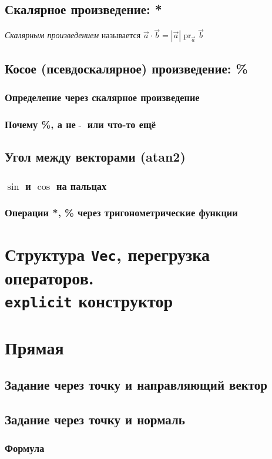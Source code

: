 \documentclass[a4paper,12pt]{article}
\def\v{\vec}
\DeclareMathOperator{\pr}{pr}
\begin{document}
    \subsection{Скалярное произведение: *}
      \emph{Скалярным произведением} называется
      $\v a \cdot \v b = |\v a|\pr_{\v a} \v b$
    \subsection{Косое (псевдоскалярное) произведение: \%}
      \subsubsection{Определение через скалярное произведение}
      \subsubsection{Почему \%, а не $\ \widehat{}\ $ или что-то ещё}
    \subsection{Угол между векторами (atan2)}
      \subsubsection{$\sin$ и $\cos$ на пальцах}
      \subsubsection{Операции *, \% через тригонометрические функции}
   \section{Структура \texttt{Vec}, перегрузка операторов.\\ \texttt{explicit} конструктор}
   
   \section{Прямая}
     \subsection{Задание через точку и направляющий вектор}
     \subsection{Задание через точку и нормаль}
       \subsubsection{Формула}
\end{document}
